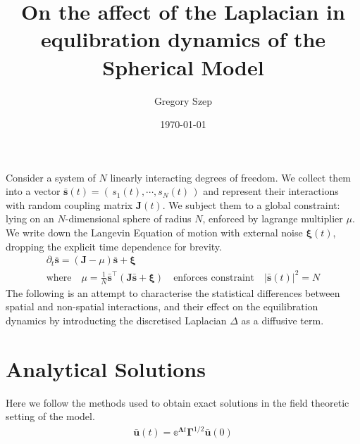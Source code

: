 \documentclass{article}[12pt]
\numberwithin{equation}{section}
\begin{document}
\title{
On the affect of the Laplacian in equlibration
dynamics of the Spherical Model
}

\author{Gregory Szep}
\date{\today}

\maketitle
Consider a system of $N$ linearly interacting degrees of freedom. We collect
them into a vector $\mathbf{\bar s}(t) = \left(\,s_1(t),\cdots, s_N(t)\,\right)$
and represent their interactions with random coupling matrix $\mathbf{J}(t)$.
We subject them to a global constraint: lying on an $N$-dimensional sphere of
radius $N$, enforced by lagrange multiplier $\mu$. We write down the
Langevin Equation of motion with external noise $\boldsymbol\xi(t)$, dropping
the explicit time dependence for brevity.
\begin{gather}
\partial_t\mathbf{\bar s} = (\mathbf{J}-\mu)\mathbf{\bar s}+\boldsymbol\xi\quad\\
\text{where}\quad\mu = \frac{1}{N}\mathbf{\bar s}^{\top}\left(\mathbf{J}\mathbf{\bar s}+\boldsymbol\xi\right)\quad\text{enforces constraint}\quad|\mathbf{\bar s}(t)|^2=N
\end{gather}
The following is an attempt to characterise the statistical differences between
spatial and non-spatial interactions, and their effect on the equilibration
dynamics by introducting the discretised Laplacian $\Delta$ as a diffusive term.

\section{Analytical Solutions}
Here we follow the methods used to obtain exact solutions\cite{} in the
field theoretic setting of the model.
\begin{align*}
  \mathbf{\bar u}(t)=\mathbb{e}^{\mathbf{\Lambda}t}\mathbf\Gamma^{1/2}\mathbf{\bar u}(0)
\end{align*}
\end{document}
